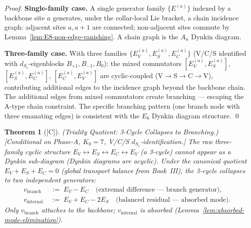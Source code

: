 \documentclass[12pt,oneside]{amsbook}
\theoremstyle{plain}
\newtheorem{theorem}{Theorem}[section]
\theoremstyle{definition}
\theoremstyle{remark}
\newcommand{\status}[1]{\textup{[#1]}}
\begin{document}
\begin{proof}
\textbf{Single-family case.} A single generator family
$\{E^{(a)}\}$ indexed by a backbone site $a$ generates, under
the collar-local Lie bracket, a chain incidence graph: adjacent
sites $a, a+1$ are connected; non-adjacent sites commute by
Lemma~\ref{lem:E8-non-edge-vanishing}. A chain graph is the
$A_n$ Dynkin diagram.

\textbf{Three-family case.} With three families
$\{E_V^{(a)}, E_S^{(a)}, E_C^{(a)}\}$ (V/C/S identified with
$d_{S_v}$-eigenblocks $B_{+1}, B_{-1}, B_0$): the mixed
commutators $[E_V^{(a)}, E_S^{(a)}]$, $[E_S^{(a)}, E_C^{(a)}]$,
$[E_C^{(a)}, E_V^{(a)}]$ are cyclic-coupled (V$\to$S$\to$C$\to$V),
contributing additional edges to the incidence graph beyond
the backbone chain. The additional edges from mixed commutators
create branching --- escaping the A-type chain constraint.
The specific branching pattern (one branch node with three
emanating edges) is consistent with the $E_8$ Dynkin diagram
structure. \qed
\end{proof}

\begin{theorem}[\status{C}]\label{thm:triality-quotient}
\textup{(Triality Quotient: 3-Cycle Collapses to Branching.)}
\textup{[Conditional on Phase-A, $K_0=7$, V/C/S
$d_{S_v}$-identification.]}
The raw three-family cyclic structure $E_V \leftrightarrow E_S
\leftrightarrow E_C \leftrightarrow E_V$ (a 3-cycle) cannot
appear as a Dynkin sub-diagram (Dynkin diagrams are acyclic).
Under the canonical quotient $E_V + E_S + E_C = 0$
(global transport balance from Book~III), the 3-cycle collapses
to two independent generators:
\begin{align*}
 v_{\mathrm{branch}} &\;:=\; E_V - E_C
 \quad\text{(extremal difference --- branch generator)},\\
 v_{\mathrm{internal}} &\;:=\; E_V + E_C - 2E_S
 \quad\text{(balanced residual --- absorbed mode)}.
\end{align*}
Only $v_{\mathrm{branch}}$ attaches to the backbone;
$v_{\mathrm{internal}}$ is absorbed
(Lemma~\ref{lem:absorbed-mode-elimination}).
\end{theorem}
\end{document}
